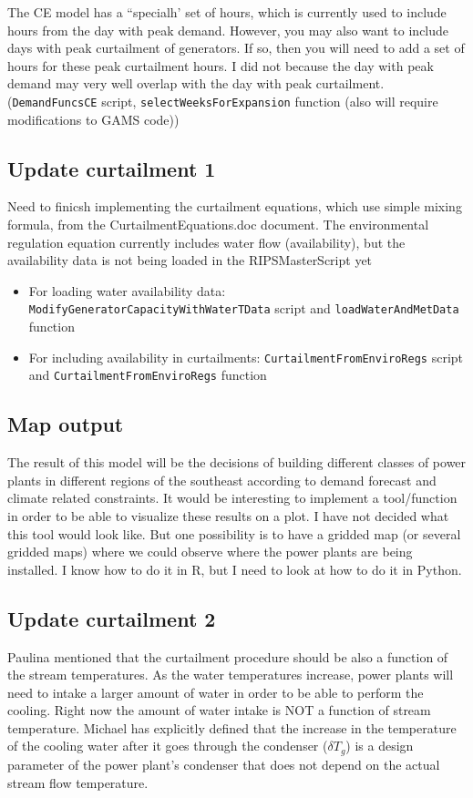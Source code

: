 \documentclass[11pt, oneside]{article}   	%
\begin{document}
The CE model has a ``specialh' set of hours, which is currently used to include hours from the day with peak demand. However, you may also want to include days with peak curtailment of generators. If so, then you will need to add a set of hours for these peak curtailment hours. I did not because the day with peak demand may very well overlap with the day with peak curtailment. (\texttt{DemandFuncsCE} script, \texttt{selectWeeksForExpansion} function (also will require modifications to GAMS code))

\subsection{Update curtailment 1}

Need to finicsh implementing the curtailment equations, which use simple mixing formula, from the CurtailmentEquations.doc document. The environmental regulation equation currently includes water flow (availability), but the availability data is not being loaded in the RIPSMasterScript yet

\begin{itemize}
\item For loading water availability data: \texttt{ModifyGeneratorCapacityWithWaterTData} script and \texttt{loadWaterAndMetData} function
\item For including availability in curtailments: \texttt{CurtailmentFromEnviroRegs} script and \texttt{CurtailmentFromEnviroRegs} function
\end{itemize}

\subsection{Map output}

The result of this model will be the decisions of building different classes of power plants in different regions of the southeast according to demand forecast and climate related constraints. It would be interesting to implement a tool/function in order to be able to visualize these results on a plot. I have not decided what this tool would look like. But one possibility is to have a gridded map (or several gridded maps) where we could observe where the power plants are being installed. I know how to do it in R, but I need to look at how to do it in Python.

\subsection{Update curtailment 2}
Paulina mentioned that the curtailment procedure should be also a function of the stream temperatures. As the water temperatures increase, power plants will need to intake a larger amount of water in order to be able to perform the cooling. Right now the amount of water intake is NOT a function of stream temperature. Michael has explicitly defined that the increase in the temperature of the cooling water after it goes through the condenser ($\delta T_g$) is a design parameter of the power plant's condenser that does not depend on the actual stream flow temperature.
\end{document}
